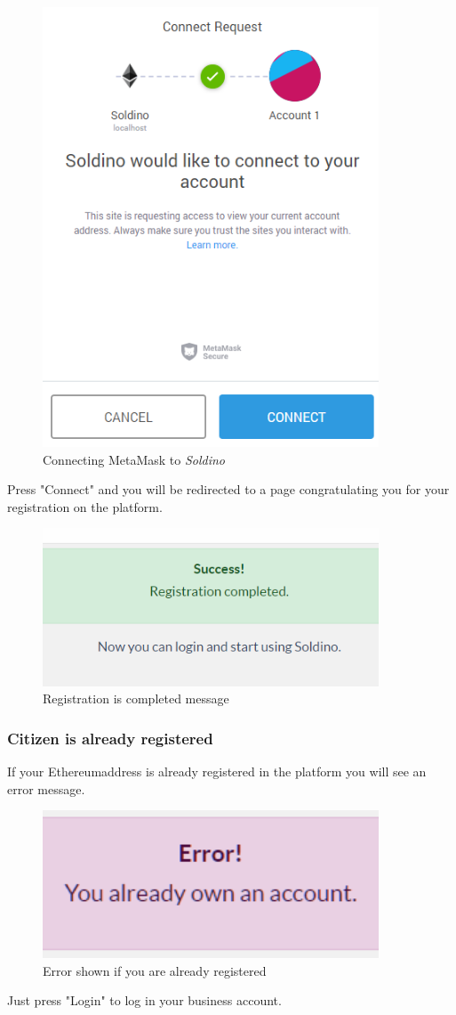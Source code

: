 	\begin{figure}[H]
		\includegraphics[width=10cm]{res/images/metamask_connect.png}
		\centering
		\caption{Connecting MetaMask to \textit{Soldino}}
	\end{figure}
	\noindent \noindent Press "Connect" and you will be redirected to a page 
	congratulating you for your registration on the platform.
	\begin{figure}[H]
		\includegraphics[width=10cm]{res/images/registration_complete.png}
		\centering
		\caption{Registration is completed message}
	\end{figure}
		\subsubsection{Citizen is already registered}
		If your Ethereum\glosp address is already registered in the platform you will 
		see an error message.
		\begin{figure}[H]
			\includegraphics[width=10cm]{res/images/user_already_registered.png}
			\centering
			\caption{Error shown if you are already registered}
		\end{figure}
		\noindent Just press "Login" to log in your business account.
